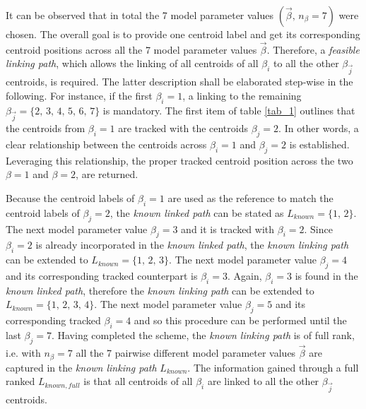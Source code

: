 

It can be observed that in total the 7 model parameter values $(\vec{\beta}, \, n_{\beta}=7)$ were chosen.
The overall goal is to provide one centroid label and get its corresponding centroid positions across all the 7 model parameter values $\vec{\beta }$. 
Therefore, a \emph{feasible linking path}, which allows the linking of all centroids of all $\beta_i$ to all the other $\beta_{\vec{j}}$ centroids, is required.
The latter description shall be elaborated step-wise in the following.
For instance, if the first $\beta_i = 1$, a linking to the remaining $\beta_{\vec{j}} = \{2, \, 3, \, 4, \, 5, \, 6, \, 7 \}$ is mandatory.
The first item of table \ref{tab_1} outlines that the centroids from $\beta_i = 1$ are tracked with the centroids $\beta_j=2$.
In other words, a clear relationship between the centroids across  $\beta_i = 1$ and $\beta_j=2$ is established. Leveraging this relationship, the proper tracked centroid position across the two $ \beta = 1$ and $\beta= 2$, are returned.\newline


Because the centroid labels of $\beta_i = 1$ are used as the reference to match the centroid labels of $\beta_j=2$, the \emph{known linked path} can be stated as $L_{known}= \{1,\, 2\}$. The next model parameter value $\beta_j = 3$ and it is tracked with $\beta_i =2$. 
Since $\beta_i =2$ is already incorporated in the \emph{known linked path}, the \emph{known linking path} can be extended to $L_{known}= \{1,\, 2, \, 3\}$. The next model parameter value $\beta_j = 4$ and its corresponding tracked counterpart is $\beta_i =3$. 
Again, $\beta_i =3$ is found in the \emph{known linked path}, therefore the \emph{known linking path} can be extended to $L_{known}= \{1,\, 2, \, 3, \, 4\}$. The next model parameter value $\beta_j = 5$ and its corresponding tracked $\beta_i =4$ and so this procedure can be performed until the last $\beta_j = 7$.
Having completed the scheme, the \emph{known linking path} is of full rank, i.e. with $n_{\beta}= 7$ all the 7 pairwise different model parameter values $\vec{\beta}$ are captured in the \emph{known linking path} $L_{known}$.
The information gained through a full ranked $L_{known, full}$ is that all centroids of all $\beta_i$ are linked to all the other $\beta_{\vec{j}}$ centroids. 
\newline 

